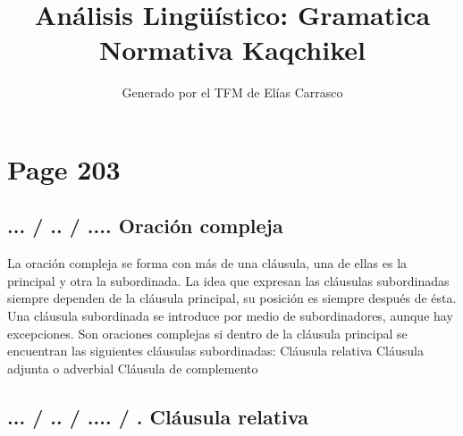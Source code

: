 \documentclass{article}%
\title{Análisis Lingüístico: Gramatica Normativa Kaqchikel}%
\author{Generado por el TFM de Elías Carrasco}%
\begin{document}
%
\normalsize%
\maketitle%
\section{Page 203}%
\label{sec:Page203}%
\subsection{... / .. / .... Oración compleja}%
\label{subsec:.../../....Oracincompleja}%

%
La oración compleja se forma con más de una cláusula, una de ellas es la principal y %
otra la subordinada. La idea que expresan las cláusulas subordinadas siempre dependen %
de la cláusula principal, su posición es siempre después de ésta. Una cláusula subordinada %
se introduce por medio de subordinadores, aunque hay excepciones. Son oraciones %
complejas si dentro de la cláusula principal se encuentran las siguientes cláusulas %
subordinadas: %
Cláusula relativa %
Cláusula adjunta o adverbial %
Cláusula de complemento %
\subsection{... / .. / .... / . Cláusula relativa}%
\label{subsec:.../../..../.Clusularelativa}%
\end{document}
